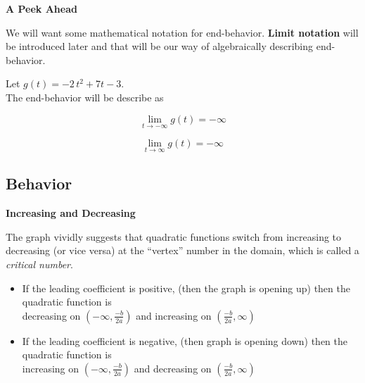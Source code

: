 \documentclass{ximera}
\begin{document}
\begin{idea} \textbf{\textcolor{red!80!black}{A Peek Ahead}}

We will want some mathematical notation for end-behavior.  \textbf{Limit notation} will be introduced later and that will be our way of algebraically describing end-behavior. \\




\begin{example}

Let $g(t) = -2 \, t^2 + 7t - 3$. \\


The end-behavior will be describe as 

\[
\lim\limits_{t \to -\infty} g(t) = -\infty
\]


\[
\lim\limits_{t \to \infty} g(t) = -\infty
\]

\end{example}




\end{idea}

















\subsection*{Behavior}



\textbf{\textcolor{blue!55!black}{Increasing and Decreasing}}






The graph vividly suggests that quadratic functions switch from increasing to decreasing (or vice versa) at the ``vertex'' number in the domain, which is called a \textit{critical number}.


\begin{itemize}
\item If the leading coefficient is positive, (then the graph is opening up) then the quadratic function is \\

decreasing on $\left( -\infty, \frac{-b}{2a} \right)$ and increasing on $\left( \frac{-b}{2a}, \infty \right)$

\item If the leading coefficient is negative, (then graph is opening down) then the quadratic function is \\

increasing on $\left( -\infty, \frac{-b}{2a} \right)$ and decreasing on $\left( \frac{-b}{2a}, \infty \right)$
\end{itemize}
\end{document}

